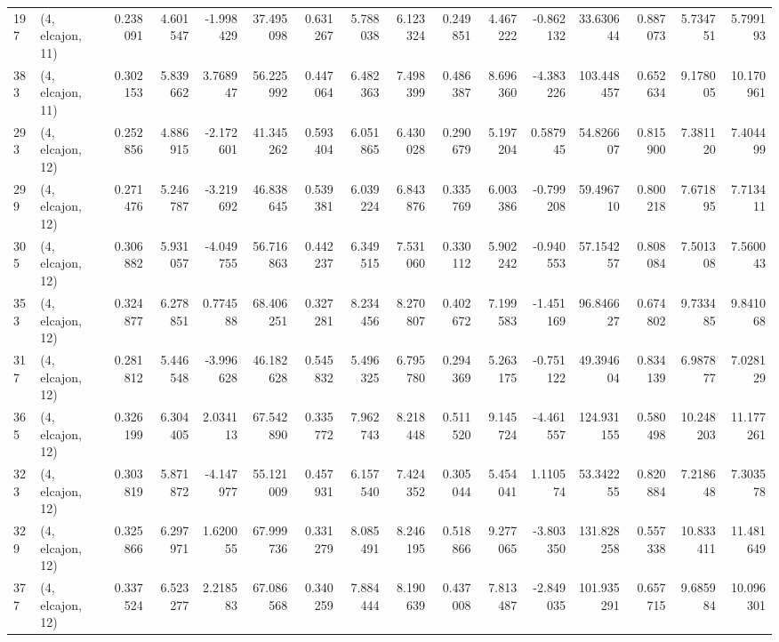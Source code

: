 \begin{tabular}{llrrrrrrrrrrrrrr}
197 &  (4, elcajon, 11) &   0.238091 &   4.601547 &  -1.998429 &    37.495098 &   0.631267 &   5.788038 &   6.123324 &  0.249851 &   4.467222 &  -0.862132 &    33.630644 &   0.887073 &   5.734751 &   5.799193 \\
383 &  (4, elcajon, 11) &   0.302153 &   5.839662 &   3.768947 &    56.225992 &   0.447064 &   6.482363 &   7.498399 &  0.486387 &   8.696360 &  -4.383226 &   103.448457 &   0.652634 &   9.178005 &  10.170961 \\
293 &  (4, elcajon, 12) &   0.252856 &   4.886915 &  -2.172601 &    41.345262 &   0.593404 &   6.051865 &   6.430028 &  0.290679 &   5.197204 &   0.587945 &    54.826607 &   0.815900 &   7.381120 &   7.404499 \\
299 &  (4, elcajon, 12) &   0.271476 &   5.246787 &  -3.219692 &    46.838645 &   0.539381 &   6.039224 &   6.843876 &  0.335769 &   6.003386 &  -0.799208 &    59.496710 &   0.800218 &   7.671895 &   7.713411 \\
305 &  (4, elcajon, 12) &   0.306882 &   5.931057 &  -4.049755 &    56.716863 &   0.442237 &   6.349515 &   7.531060 &  0.330112 &   5.902242 &  -0.940553 &    57.154257 &   0.808084 &   7.501308 &   7.560043 \\
353 &  (4, elcajon, 12) &   0.324877 &   6.278851 &   0.774588 &    68.406251 &   0.327281 &   8.234456 &   8.270807 &  0.402672 &   7.199583 &  -1.451169 &    96.846627 &   0.674802 &   9.733485 &   9.841068 \\
317 &  (4, elcajon, 12) &   0.281812 &   5.446548 &  -3.996628 &    46.182628 &   0.545832 &   5.496325 &   6.795780 &  0.294369 &   5.263175 &  -0.751122 &    49.394604 &   0.834139 &   6.987877 &   7.028129 \\
365 &  (4, elcajon, 12) &   0.326199 &   6.304405 &   2.034113 &    67.542890 &   0.335772 &   7.962743 &   8.218448 &  0.511520 &   9.145724 &  -4.461557 &   124.931155 &   0.580498 &  10.248203 &  11.177261 \\
323 &  (4, elcajon, 12) &   0.303819 &   5.871872 &  -4.147977 &    55.121009 &   0.457931 &   6.157540 &   7.424352 &  0.305044 &   5.454041 &   1.110574 &    53.342255 &   0.820884 &   7.218648 &   7.303578 \\
329 &  (4, elcajon, 12) &   0.325866 &   6.297971 &   1.620055 &    67.999736 &   0.331279 &   8.085491 &   8.246195 &  0.518866 &   9.277065 &  -3.803350 &   131.828258 &   0.557338 &  10.833411 &  11.481649 \\
377 &  (4, elcajon, 12) &   0.337524 &   6.523277 &   2.218583 &    67.086568 &   0.340259 &   7.884444 &   8.190639 &  0.437008 &   7.813487 &  -2.849035 &   101.935291 &   0.657715 &   9.685984 &  10.096301 \\

\end{tabular}
